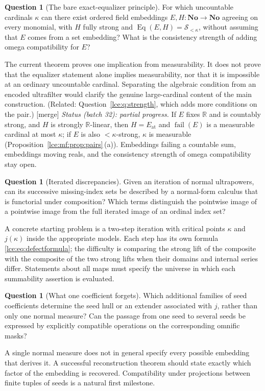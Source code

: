 \documentclass[11pt,letterpaper]{article}
\numberwithin{equation}{section}
\theoremstyle{definition}
\newtheorem{question}[theorem]{Question}
\theoremstyle{remark}
\newcommand{\No}{\mathbf{No}}
\newcommand{\R}{\mathbb R}
\newcommand{\Sk}{\mathscr S_{<\kappa}}
\newcommand{\prref}[1]{Proposition~\ref{#1}}
\newcommand{\mergetag}{\textup{\textsf{\small[merge]}}}%
\newcommand{\Eq}{\operatorname{Eq}}
\newcommand{\at}{\mathrm{at}}
\newcommand{\fail}{\operatorname{fail}}
\begin{document}
\begin{question}[The bare exact-equalizer principle]\label{lce:sg:q:equalizer}
For which uncountable cardinals $\kappa$ can there exist ordered field
embeddings $E,H:\No\to\No$ agreeing on every monomial, with $H$ fully strong
and $\Eq(E,H)=\Sk$, without assuming that $E$ comes from a set embedding?
What is the consistency strength of adding omega compatibility for $E$?
\end{question}
The current theorem proves one implication from measurability. It does not
prove that the equalizer statement alone implies measurability, nor that it
is impossible at an ordinary uncountable cardinal. Separating the algebraic
condition from an encoded ultrafilter would clarify the genuine
large-cardinal content of the main construction. (Related:
Question~\ref{lce:q:strength}, which adds more conditions on the pair.)
\mergetag{} \emph{Status (batch 32): partial progress.} If $E$ fixes $\R$ and
is countably strong, and $H$ is strongly $\R$-linear, then $H=E_{\at}$ and
$\fail(E)$ is a measurable cardinal at most $\kappa$; if $E$ is also
${<}\kappa$-strong, $\kappa$ is measurable (\prref{lce:mf:prop:pairs}\,(a)).
Embeddings failing a countable sum, embeddings moving reals, and the
consistency strength of omega compatibility stay open.

\begin{question}[Iterated discrepancies]\label{lce:sg:q:iteration}
Given an iteration of normal ultrapowers, can its successive missing-index
sets be described by a normal-form calculus that is functorial under
composition? Which terms distinguish the pointwise image of a pointwise
image from the full iterated image of an ordinal index set?
\end{question}
A concrete starting problem is a two-step iteration with critical points
$\kappa$ and $j(\kappa)$ inside the appropriate models. Each step has its own
formula \eqref{lce:eq:defectformula}; the difficulty is comparing the strong
lift of the composite with the composite of the two strong lifts when their
domains and internal series differ. Statements about all maps must specify
the universe in which each summability assertion is evaluated.

\begin{question}[What one coefficient forgets]\label{lce:sg:q:seedhull}
Which additional families of seed coefficients determine the seed hull or
an extender associated with $j$, rather than only one normal measure? Can
the passage from one seed to several seeds be expressed by explicitly
compatible operations on the corresponding omnific masks?
\end{question}
A single normal measure does not in general specify every possible
embedding that derives it. A successful reconstruction theorem should state
exactly which factor of the embedding is recovered. Compatibility under
projections between finite tuples of seeds is a natural first milestone.
\end{document}
